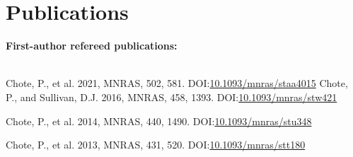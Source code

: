 \documentclass[print]{cv-style}
\begin{document}
\section{Publications}
{\bf First-author refereed publications:}\\
~\vspace{-2mm}\\
\begin{entrylist}
  {\small Chote, P., et al. 2021, MNRAS, 502, 581. \textsc{DOI:}\href{http://dx.doi.org/10.1093/mnras/staa4015}{10.1093/mnras/staa4015}}
  {\small Chote, P., and Sullivan, D.J. 2016, MNRAS, 458, 1393. \textsc{DOI:}\href{http://dx.doi.org/10.1093/mnras/stw421}{10.1093/mnras/stw421}}

  {\small Chote, P., et al. 2014, MNRAS, 440, 1490. \textsc{DOI:}\href{http://dx.doi.org/10.1093/mnras/stu348}{10.1093/mnras/stu348}}
  
  {\small Chote, P., et al. 2013, MNRAS, 431, 520. \textsc{DOI:}\href{http://dx.doi.org/10.1093/mnras/stt180}{10.1093/mnras/stt180}}
\end{entrylist}\\
\end{document}
